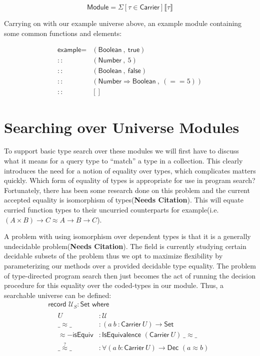 \documentclass[acmsmall,review,authorversion]{acmart}
\newcommand{\NC}{(\textbf{Needs Citation})}
\newcommand{\term}[1]{\textsf{#1}}
\newcommand{\type}[1]{\textsf{#1}}
\newcommand{\Carrier}{\term{Carrier}}
\newcommand{\Universe}{\mathcal{U}}
\newcommand{\Set}{\type{Set}}
\newcommand{\Boolean}{\term{Boolean}}
\newcommand{\true}{\term{true}}
\newcommand{\false}{\term{false}}
\newcommand{\Number}{\term{Number}}
\newcommand{\Interp}[1]{\llbracket #1 \rrbracket}
\newcommand{\?}{\stackrel{?}{\approx}}
\newcommand{\record}[2]{\textsf{record } #1 : #2 \textsf{ where}}
\begin{document}
$$
\textsf{Module} = \Sigma[ \tau \in \Carrier ] \Interp{ \tau }
$$

Carrying on with our example universe above, an example module containing some
common functions and elements:

$$
\begin{array}{rl}
  \textsf{example} =& (\Boolean\ ,\ \true)\\
                  ::& (\Number\ ,\ 5 )\\
                  ::& (\Boolean\ ,\ \false )\\
                  ::& (\Number \Rightarrow \Boolean\ ,\ (== 5) )\\
                  ::&[]
\end{array}
$$


\section{Searching over Universe Modules}

To support basic type search over these modules we will first have to discuss
what it means for a query type to ``match'' a type in a collection. This clearly
introduces the need for a notion of equality over types, which complicates
matters quickly. Which form of equality of types is appropriate for use in
program search? Fortunately, there has been some research done on this problem
and the current accepted equality is isomorphism of types\NC. This
will equate curried function types to their uncurried counterparts for
example(i.e. $(A \times B) \rightarrow C \approx A \rightarrow B \rightarrow
C$).

A problem with using isomorphism over dependent types is that it is a generally
undecidable problem\NC. The field is currently studying certain decidable
subsets of the problem thus we opt to maximize flexibility by parameterizing our
methods over a provided decidable type equality. The problem of type-directed
program search then just becomes the act of running the decision procedure for
this equality over the coded-types in our module. Thus, a searchable universe
can be defined:
$$
\begin{array}{l}
  \record{\Universe_S}{\Set}\\
  \quad \begin{array}{ll}
          U &: \Universe\\
         \_\approx\_ &: (a\ b\ : \Carrier\ U) \rightarrow \Set\\
         \approx-\textsf{isEquiv} &: \textsf{IsEquivalence } (\Carrier\ U)\ \_\approx\_\\
         \_\?\_ &: \forall (a\ b : \Carrier\ U) \rightarrow \textsf{Dec } (a \approx b)
        \end{array}
\end{array}
$$
\end{document}
